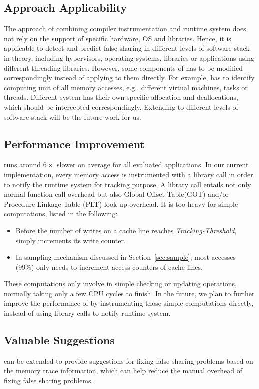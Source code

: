 \label{sec:futurework}

\subsection{Approach Applicability}
The approach of combining compiler instrumentation and runtime system does not rely on the support of specific hardware, OS and libraries.
Hence, it is applicable to detect and predict false sharing in different levels of 
software stack in theory, including hypervisors, operating systems, libraries or 
applications using different threading libraries.
However, some components of \Predator{} has to be 
modified correspondingly instead of applying to them directly.
For example, \Predator{} has to identify computing unit of all memory accesses, 
e.g., different virtual machines, tasks or threads. 
Different system has their own specific allocation and deallocations, which should be intercepted correspondingly. Extending \Predator{} to different levels of software stack will be the future work for us.


\subsection{Performance Improvement}
\Predator{} runs around $6\times$ slower on average for all evaluated applications. 
In our current implementation, every memory access is instrumented with a library call 
in order to notify the runtime system for tracking purpose. A library call entails not only normal function call overhead but also Global Offset Table(GOT) and/or Procedure Linkage Table (PLT) look-up overhead. 
It is too heavy for simple computations, listed in the following:

\begin{itemize}
\item
Before the number of writes on a cache line reaches {\it Tracking-Threshold},  \Predator{} simply increments its write counter.

\item
In sampling mechanism discussed in Section~\ref{sec:sample}, 
most accesses (99\%) only needs to increment access counters of cache lines.
\end{itemize}

These computations only involve in simple checking or updating operations,
normally taking only a few CPU cycles to finish. 
In the future, we plan to further improve the performance of \Predator{} 
by instrumenting those simple computations directly, 
instead of using library calls to notify runtime system.

\subsection{Valuable Suggestions}
\Predator{} can be extended to provide suggestions for fixing false sharing problems based on the memory trace information, which can help reduce the manual overhead of fixing false sharing problems.  
